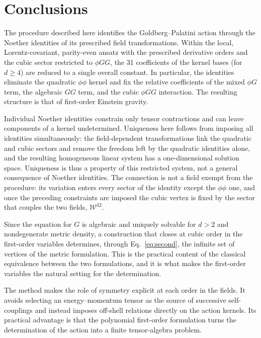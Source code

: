 \documentclass[prd,aps,preprint,superscriptaddress,nofootinbib,amsmath,amssymb,eqsecnum]{revtex4-2}
\newcommand{\W}{\mathcal{W}}
\begin{document}
\section{Conclusions}
\label{sec:conclusions}

The procedure described here identifies the Goldberg--Palatini action through the
Noether identities of its prescribed field transformations. Within the local,
Lorentz-covariant, parity-even ansatz with the prescribed derivative orders and the cubic
sector restricted to $\phi GG$, the 31 coefficients of the kernel bases (for $d\geq4$) are
reduced to a single overall constant.
In particular, the identities eliminate the quadratic $\phi\phi$ kernel and fix the relative
coefficients of the mixed $\phi G$ term, the algebraic $GG$ term, and the cubic $\phi GG$
interaction. The resulting structure is that of first-order Einstein gravity.

Individual Noether identities constrain only tensor contractions and can leave components of
a kernel undetermined. Uniqueness here follows from imposing all identities simultaneously:
the field-dependent transformations link the quadratic and cubic sectors and remove the
freedom left by the quadratic identities alone, and the resulting homogeneous linear system
has a one-dimensional solution space. Uniqueness is thus a property of this restricted
system, not a general consequence of Noether identities. The connection is not a field
exempt from the procedure: its variation enters every sector of the identity except the
$\phi\phi$ one, and once the preceding constraints are imposed the cubic vertex is fixed by
the sector that couples the two fields, $\W^{32}$.

Since the equation for $G$ is algebraic and uniquely solvable for $d>2$ and nondegenerate
metric density, a construction that closes at cubic order in the first-order variables
determines, through Eq.~\eqref{eq:second}, the infinite set of vertices of the metric
formulation. This is the practical content of the classical equivalence between the two
formulations, and it is what makes the first-order variables the natural setting for the
determination.

The method makes the role of symmetry explicit at each order in the fields. It avoids
selecting an energy--momentum tensor as the source of successive self-couplings and instead
imposes off-shell relations directly on the action kernels. Its practical advantage is that
the polynomial first-order formulation turns the determination of the action into a finite tensor-algebra
problem.
\end{document}
